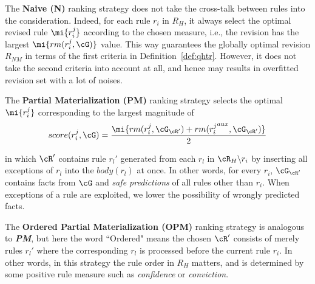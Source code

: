 The \textbf{Naive (N)} ranking strategy does not take the cross-talk between rules into the consideration. Indeed, for each rule $r_i$ in $R_H$, it always select the optimal revised rule $\mi{r^j_i}$ according to the chosen measure, i.e., the revision has the largest $\mi{rm(r^j_{i},\cG)}$ value. This way guarantees the globally optimal revision $R_{NM}$ in terms of the first criteria in Definition~\ref{def:qhtr}. However, it does not take the second criteria into account at all, and hence may results in overfitted revision set with a lot of noises.

The \textbf{Partial Materialization (PM)} ranking strategy selects the optimal $\mi{r^j_i}$ corresponding to the largest magnitude of
\begin{equation}
\label{pm}
score(r^j_i,\cG)=\dfrac{\mi{rm(r^j_i,\cG_{\cR'})+rm({r^j_i}^{aux},\cG_{\cR'})}}{2}
\end{equation}

in which $\cR'$ contains rule $r_l'$ generated from each $r_l$ in $\cR_H\backslash r_i$ by inserting all exceptions of $r_l$ into the $body(r_l)$ at once. In other words, for every $r_i$, $\cG_{\cR'}$ contains facts from $\cG$ and \textit{safe predictions} of all rules other than $r_i$. When exceptions of a rule are exploited, we lower the possibility of wrongly predicted facts.

The \textbf{Ordered Partial Materialization (OPM)} ranking strategy is analogous to \textbf{\emph{PM}}, but here the word ``Ordered" means the chosen $\cR'$ consists of merely rules $r_l'$ where the corresponding $r_l$ is processed before the current rule $r_i$. In other words, in this strategy the rule order in $R_H$ matters, and is determined by some positive rule measure such as \textit{confidence} or \textit{conviction}.